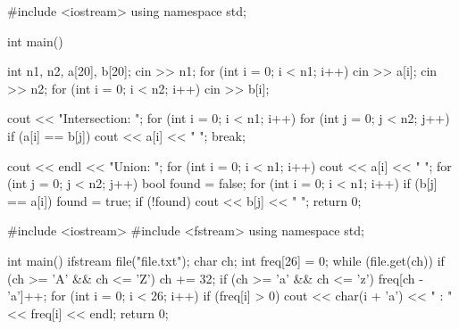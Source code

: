 \outputlabel
{}


\codelabel

\begin{code}
#include <iostream>
using namespace std;

int main() {
    int n1, n2, a[20], b[20];
    cin >> n1;
    for (int i = 0; i < n1; i++) cin >> a[i];
    cin >> n2;
    for (int i = 0; i < n2; i++) cin >> b[i];

    cout << "Intersection: ";
    for (int i = 0; i < n1; i++)
        for (int j = 0; j < n2; j++)
            if (a[i] == b[j]) { cout << a[i] << " "; break; }

    cout << endl << "Union: ";
    for (int i = 0; i < n1; i++) cout << a[i] << " ";
    for (int j = 0; j < n2; j++) {
        bool found = false;
        for (int i = 0; i < n1; i++) if (b[j] == a[i]) {found = true};
        if (!found) cout << b[j] << " ";
    }
    return 0;
}
\end{code}

\outputlabel
{}


\codelabel

\begin{code}
#include <iostream>
#include <fstream>
using namespace std;

int main() {
    ifstream file("file.txt");
    char ch;
    int freq[26] = {0};
    while (file.get(ch)) {
        if (ch >= 'A' && ch <= 'Z') ch += 32;
        if (ch >= 'a' && ch <= 'z') freq[ch - 'a']++;
    }
    for (int i = 0; i < 26; i++)
        if (freq[i] > 0) {cout << char(i + 'a') << " : " << freq[i] << endl};
    return 0;
}
\end{code}

\outputlabel
{}

